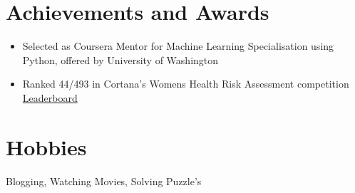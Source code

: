 \documentclass[margin, centered]{res}
\begin{document}
\begin{resume}
\section{Achievements and Awards}
\begin{itemize}[leftmargin=*]
 \item Selected as Coursera Mentor for Machine Learning Specialisation using Python, offered by University of Washington
 \item Ranked 44/493 in  Cortana's Womens Health Risk Assessment competition \href{https://gallery.cortanaintelligence.com/Competition/Women-s-Health-Risk-Assessment-1#leaderboardButton}{Leaderboard}
\end{itemize}


\section{Hobbies}
Blogging, Watching Movies, Solving Puzzle's

\end{resume}
\end{document}
